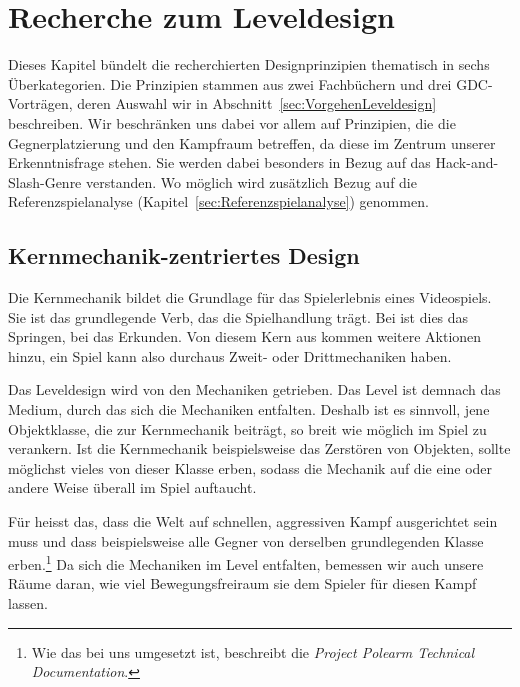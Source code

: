 \documentclass[../Main.tex]{subfiles}
\begin{document}
\section{Recherche zum Leveldesign} \label{sec:Leveldesign}
Dieses Kapitel bündelt die recherchierten Designprinzipien thematisch in sechs Überkategorien. Die Prinzipien stammen aus zwei Fachbüchern und drei GDC-Vorträgen, deren Auswahl wir in Abschnitt~\ref{sec:VorgehenLeveldesign} beschreiben. Wir beschränken uns dabei vor allem auf Prinzipien, die die Gegnerplatzierung und den Kampfraum betreffen, da diese im Zentrum unserer Erkenntnisfrage stehen. Sie werden dabei besonders in Bezug auf das Hack-and-Slash-Genre verstanden. Wo möglich wird zusätzlich Bezug auf die Referenzspielanalyse (Kapitel~\ref{sec:Referenzspielanalyse}) genommen.

\subsection{Kernmechanik-zentriertes Design} \label{sec:Kernmechanik}

Die Kernmechanik bildet die Grundlage für das Spielerlebnis eines Videospiels. Sie ist das grundlegende Verb, das die Spielhandlung trägt.\autocite[110]{totten2014architectural} Bei  ist dies das Springen, bei  das Erkunden.\autocites[110]{totten2014architectural}{nintendo_supermariobros_1985,nintendo_zelda_1986} Von diesem Kern aus kommen weitere Aktionen hinzu, ein Spiel kann also durchaus Zweit- oder Drittmechaniken haben.\autocite[110]{totten2014architectural}

Das Leveldesign wird von den Mechaniken getrieben. Das Level ist demnach das Medium, durch das sich die Mechaniken entfalten.\autocite{gdc_tenprinciples2010} Deshalb ist es sinnvoll, jene Objektklasse, die zur Kernmechanik beiträgt, so breit wie möglich im Spiel zu verankern. Ist die Kernmechanik beispielsweise das Zerstören von Objekten, sollte möglichst vieles von dieser Klasse erben, sodass die Mechanik auf die eine oder andere Weise überall im Spiel auftaucht.\autocite{gdc_movingmountains2020}

Für  heisst das, dass die Welt auf schnellen, aggressiven Kampf ausgerichtet sein muss und dass beispielsweise alle Gegner von derselben grundlegenden Klasse erben.\footnote{Wie das bei uns umgesetzt ist, beschreibt die \textit{Project Polearm Technical Documentation}.} Da sich die Mechaniken im Level entfalten, bemessen wir auch unsere Räume daran, wie viel Bewegungsfreiraum sie dem Spieler für diesen Kampf lassen.
\end{document}
